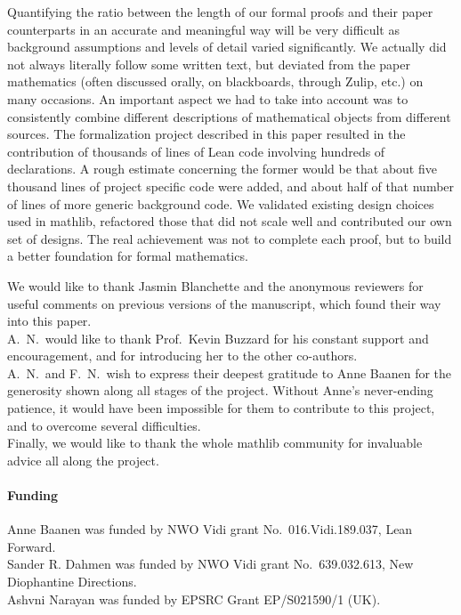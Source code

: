 \documentclass[sn-mathphys]{sn-jnl}%
\newcommand{\mathlib}{\textsf{mathlib}\xspace}
\begin{document}
Quantifying the ratio between the length of our formal proofs and their paper counterparts in an accurate and meaningful way will be very difficult as background assumptions and levels of detail varied significantly. We actually did not always literally follow some written text, but deviated from the paper mathematics (often discussed orally, on blackboards, through Zulip, etc.) on many occasions. An important aspect we had to take into account was to consistently combine different descriptions of mathematical objects from different sources.
The formalization project described in this paper resulted in the contribution of thousands of lines of Lean code involving hundreds of declarations.
A rough estimate concerning the former would be that about five thousand lines of project specific code were added, and about half of that number of lines of more generic background code.
We validated existing design choices used in \mathlib, refactored those that did not scale well
and contributed our own set of designs.
The real achievement was not to complete each proof,
but to build a better foundation for formal mathematics.

\backmatter

We would like to thank Jasmin Blanchette and the anonymous reviewers for useful comments on previous versions of the manuscript, which found their way into this paper.\\
A.~N.~would like to thank Prof.\ Kevin Buzzard for his constant support and encouragement, and for introducing her to the other co-authors.\\
A.~N.~and F.~N.~wish to express their deepest gratitude to Anne Baanen for the generosity shown along all stages of the project. Without Anne's never-ending patience, it would have been impossible for them to contribute to this project, and to overcome several difficulties.\\
Finally, we would like to thank the whole \mathlib community for invaluable advice all along the project.


\paragraph{Funding}
Anne Baanen was funded by NWO Vidi grant No.\ 016.Vidi.189.037, Lean Forward.\\
Sander R. Dahmen was funded by NWO Vidi grant No.\ 639.032.613, New Diophantine Directions.\\
Ashvni Narayan was funded by EPSRC Grant EP/S021590/1 (UK).
\end{document}
